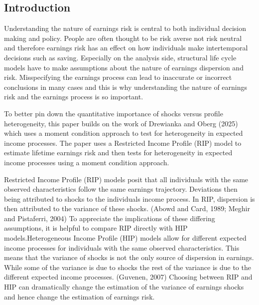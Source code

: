 \documentclass[12pt]{article}
\begin{document}











\begin{onehalfspace}

\section{Introduction}


Understanding the nature of earnings risk is central to both individual decision making and policy. People are often thought to be risk averse not risk neutral and therefore earnings risk has an effect on how individuals make intertemporal decisions such as saving. Especially on the analysis side, structural life cycle models have to make assumptions about the nature of earnings dispersion and risk. Misspecifying the earnings process can lead to inaccurate or incorrect conclusions in many cases and this is why understanding the nature of earnings risk and the earnings process is so important.

To better pin down the quantitative importance of shocks versus profile heterogeneity, this paper builds on the work of Drewianka and Oberg (2025) \cite{drewianka2025} which uses a moment condition approach to test for heterogeneity in expected income processes. The paper uses a Restricted Income Profile (RIP) model to estimate lifetime earnings risk and then tests for heterogeneity in expected income processes using a moment condition approach. 

Restricted Income Profile (RIP) models posit that all individuals with the same observed characteristics follow the same earnings trajectory. Deviations then being attributed to shocks to the individuals income process. In RIP, dispersion is then attributed to the variance of these shocks. (Abowd and Card, 1989; Meghir and Pistaferri, 2004) To appreciate the implications of these differing assumptions, it is helpful to compare RIP directly with HIP models.Heterogeneous Income Profile (HIP) models allow for different expected income processes for individuals with the same observed characteristics. This means that the variance of shocks is not the only source of dispersion in earnings. While some of the variance is due to shocks the rest of the variance is due to the different expected income processes. (Guvenen, 2007) Choosing between RIP and HIP can dramatically change the estimation of the variance of earnings shocks and hence change the estimation of earnings risk. 


\end{onehalfspace}
\end{document}
